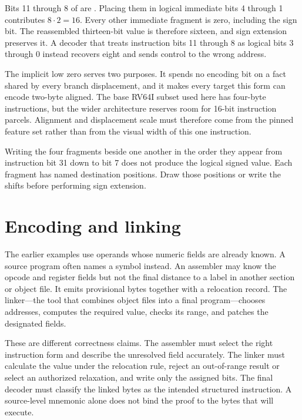 \begin{proofkit}[title={The branch fragments recover sixteen}]
Bits 11 through 8 of  are . Placing them in logical
immediate bits 4 through 1 contributes \(8\cdot2=16\). Every other immediate
fragment is zero, including the sign bit. The reassembled thirteen-bit value
is therefore sixteen, and sign extension preserves it. A decoder that treats
instruction bits 11 through 8 as logical bits 3 through 0 instead recovers
eight and sends control to the wrong address.
\end{proofkit}

The implicit low zero serves two purposes. It spends no encoding bit on a fact
shared by every branch displacement, and it makes every target this form can
encode
two-byte aligned. The base RV64I subset used here has four-byte instructions,
but the wider architecture reserves room for 16-bit instruction parcels.
Alignment and displacement scale must therefore come from the pinned feature
set rather than from the visual width of this one instruction.

\begin{warning}[title={A split immediate is not stored in reading order}]
Writing the four fragments beside one another in the order they appear from
instruction bit 31 down to bit 7 does not produce the logical signed value.
Each fragment has named destination positions. Draw those positions or write
the shifts before performing sign extension.
\end{warning}

\section{Encoding and linking}

The earlier examples use operands whose numeric fields are already known. A
source program often names a symbol instead. An assembler may know the opcode
and register fields but not the final distance to a label in another section
or object file. It emits provisional bytes together with a relocation record.
The linker---the tool that combines object files into a final program---chooses
addresses, computes the required value, checks its range, and patches the
designated fields.

These are different correctness claims. The assembler must select the right
instruction form and describe the unresolved field accurately. The linker
must calculate the value under the relocation rule, reject an out-of-range
result or select an authorized relaxation, and write only the assigned bits.
The final decoder must classify the linked bytes as the intended structured
instruction. A source-level mnemonic alone does not bind the proof to the
bytes that will execute.

